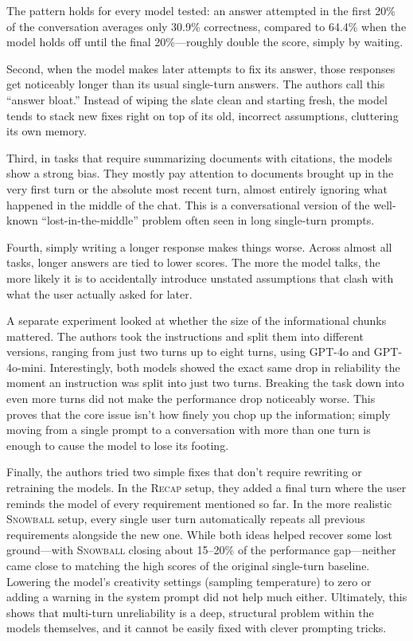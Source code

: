 \documentclass[manuscript,review]{acmart}
\begin{document}
The pattern holds for every model tested: an answer attempted in the first 20\% of the conversation averages only 30.9\% correctness, compared to 64.4\% when the model holds off until the final 20\%---roughly double the score, simply by waiting.

Second, when the model makes later attempts to fix its answer, those responses get noticeably longer than its usual single-turn answers. The authors call this ``answer bloat.'' Instead of wiping the slate clean and starting fresh, the model tends to stack new fixes right on top of its old, incorrect assumptions, cluttering its own memory.

Third, in tasks that require summarizing documents with citations, the models show a strong bias. They mostly pay attention to documents brought up in the very first turn or the absolute most recent turn, almost entirely ignoring what happened in the middle of the chat. This is a conversational version of the well-known ``lost-in-the-middle'' problem \cite{liu2024lost} often seen in long single-turn prompts.

Fourth, simply writing a longer response makes things worse. Across almost all tasks, longer answers are tied to lower scores. The more the model talks, the more likely it is to accidentally introduce unstated assumptions that clash with what the user actually asked for later.

A separate experiment looked at whether the size of the informational chunks mattered. The authors took the instructions and split them into different versions, ranging from just two turns up to eight turns, using GPT-4o and GPT-4o-mini. Interestingly, both models showed the exact same drop in reliability the moment an instruction was split into just two turns. Breaking the task down into even more turns did not make the performance drop noticeably worse. This proves that the core issue isn't how finely you chop up the information; simply moving from a single prompt to a conversation with more than one turn is enough to cause the model to lose its footing.

Finally, the authors tried two simple fixes that don't require rewriting or retraining the models. In the \textsc{Recap} setup, they added a final turn where the user reminds the model of every requirement mentioned so far. In the more realistic \textsc{Snowball} setup, every single user turn automatically repeats all previous requirements alongside the new one. While both ideas helped recover some lost ground—with \textsc{Snowball} closing about 15--20\% of the performance gap—neither came close to matching the high scores of the original single-turn baseline. Lowering the model's creativity settings (sampling temperature) to zero or adding a warning in the system prompt did not help much either. Ultimately, this shows that multi-turn unreliability is a deep, structural problem within the models themselves, and it cannot be easily fixed with clever prompting tricks.
\end{document}
